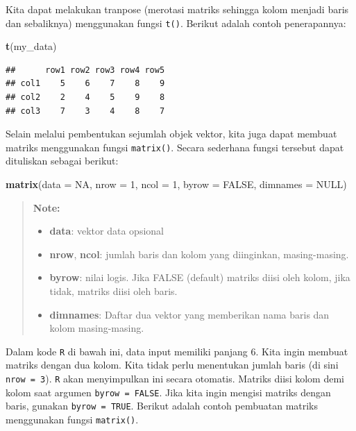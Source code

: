 \documentclass[]{book}
\newenvironment{Shaded}{\begin{snugshade}}{\end{snugshade}}
\newcommand{\KeywordTok}[1]{\textcolor[rgb]{0.13,0.29,0.53}{\textbf{#1}}}
\newcommand{\DataTypeTok}[1]{\textcolor[rgb]{0.13,0.29,0.53}{#1}}
\newcommand{\DecValTok}[1]{\textcolor[rgb]{0.00,0.00,0.81}{#1}}
\newcommand{\OtherTok}[1]{\textcolor[rgb]{0.56,0.35,0.01}{#1}}
\newcommand{\NormalTok}[1]{#1}
\providecommand{\tightlist}{%
  \setlength{\itemsep}{0pt}\setlength{\parskip}{0pt}}
\begin{document}
Kita dapat melakukan tranpose (merotasi matriks sehingga kolom menjadi
baris dan sebaliknya) menggunakan fungsi \texttt{t()}. Berikut adalah
contoh penerapannya:

\begin{Shaded}
\begin{Highlighting}[]
\KeywordTok{t}\NormalTok{(my_data)}
\end{Highlighting}
\end{Shaded}

\begin{verbatim}
##      row1 row2 row3 row4 row5
## col1    5    6    7    8    9
## col2    2    4    5    9    8
## col3    7    3    4    8    7
\end{verbatim}

Selain melalui pembentukan sejumlah objek vektor, kita juga dapat
membuat matriks menggunakan fungsi \texttt{matrix()}. Secara sederhana
fungsi tersebut dapat dituliskan sebagai berikut:

\begin{Shaded}
\begin{Highlighting}[]
\KeywordTok{matrix}\NormalTok{(}\DataTypeTok{data =} \OtherTok{NA}\NormalTok{, }\DataTypeTok{nrow =} \DecValTok{1}\NormalTok{, }\DataTypeTok{ncol =} \DecValTok{1}\NormalTok{, }\DataTypeTok{byrow =} \OtherTok{FALSE}\NormalTok{,}
       \DataTypeTok{dimnames =} \OtherTok{NULL}\NormalTok{)}
\end{Highlighting}
\end{Shaded}

\begin{quote}
\textbf{Note: }

\begin{itemize}
\tightlist
\item
  \textbf{data}: vektor data opsional
\item
  \textbf{nrow}, \textbf{ncol}: jumlah baris dan kolom yang diinginkan,
  masing-masing.
\item
  \textbf{byrow}: nilai logis. Jika FALSE (default) matriks diisi oleh
  kolom, jika tidak, matriks diisi oleh baris.
\item
  \textbf{dimnames}: Daftar dua vektor yang memberikan nama baris dan
  kolom masing-masing.
\end{itemize}
\end{quote}

Dalam kode \texttt{R} di bawah ini, data input memiliki panjang 6. Kita
ingin membuat matriks dengan dua kolom. Kita tidak perlu menentukan
jumlah baris (di sini \texttt{nrow\ =\ 3}). \texttt{R} akan menyimpulkan
ini secara otomatis. Matriks diisi kolom demi kolom saat argumen
\texttt{byrow\ =\ FALSE}. Jika kita ingin mengisi matriks dengan baris,
gunakan \texttt{byrow\ =\ TRUE}. Berikut adalah contoh pembuatan matriks
menggunakan fungsi \texttt{matrix()}.
\end{document}
